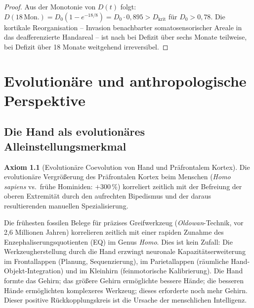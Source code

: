 ﻿\documentclass[12pt,a4paper]{report}
\theoremstyle{plain}
\theoremstyle{definition}
\newtheorem{axiom}[theorem]{Axiom}
\theoremstyle{remark}
\begin{document}
\begin{proof}
Aus der Monotonie von $D(t)$ folgt: $D(18\,\text{Mon.}) = D_0(1 - e^{-18/8})
= D_0 \cdot 0{,}895 > D_{\text{krit}}$ für $D_0 > 0{,}78$. Die kortikale
Reorganisation -- Invasion benachbarter somatosensorischer Areale in das
deafferenzierte Handareal -- ist nach \cite{merzenich1984} bei Defizit über
sechs Monate teilweise, bei Defizit über 18 Monate weitgehend irreversibel.
\end{proof}

\chapter{Evolutionäre und anthropologische Perspektive}
\label{chap:evolution}

\section{Die Hand als evolutionäres Alleinstellungsmerkmal}

\begin{axiom}[Evolutionäre Coevolution von Hand und Präfrontalem Kortex]
\label{ax:coevolution}
Die evolutionäre Vergrößerung des Präfrontalen Kortex beim Menschen
(\emph{Homo sapiens} vs.\ frühe Hominiden: $+$300\,\%) korreliert zeitlich
mit der Befreiung der oberen Extremität durch den aufrechten Bipedismus
und der daraus resultierenden manuellen Spezialisierung.
\end{axiom}

Die frühesten fossilen Belege für präzises Greifwerkzeug (\emph{Oldowan}-Technik,
vor 2{,}6 Millionen Jahren) korrelieren zeitlich mit einer rapiden Zunahme
des Enzephaliserungsquotienten (EQ) im Genus \emph{Homo}. Dies ist kein
Zufall: Die Werkzeugherstellung durch die Hand erzwingt neuronale
Kapazitätserweiterung im Frontallappen (Planung, Sequenzierung), im
Parietallappen (räumliche Hand-Objekt-Integration) und im Kleinhirn
(feinmotorische Kalibrierung). Die Hand formte das Gehirn; das größere
Gehirn ermöglichte bessere Hände; die besseren Hände ermöglichten
komplexeres Werkzeug; dieses erforderte noch mehr Gehirn. Dieser
positive Rückkopplungskreis ist die Ursache der menschlichen Intelligenz.
\end{document}
